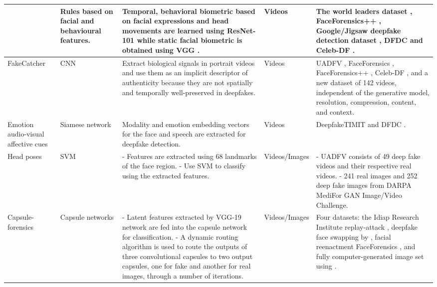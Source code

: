 \begin{table}[h!]
\begin{scriptsize}
\begin{tabularx}{\linewidth}{p{} p{} p{} p{} p{}}
& Rules based on facial and behavioural features.
& Temporal, behavioral biometric based on facial expressions and head movements are learned using ResNet-101  while static facial biometric is obtained using VGG .
& Videos
& The world leaders dataset , FaceForensics++ , Google/Jigsaw deepfake detection dataset , DFDC  and Celeb-DF .\\
\hline
FakeCatcher 
& CNN
& Extract biological signals in portrait videos and use them as an implicit descriptor of authenticity because they are not spatially and temporally well-preserved in deepfakes.
& Videos
& UADFV , FaceForensics , FaceForensics++ , Celeb-DF , and a new dataset of 142 videos, independent of the generative model, resolution, compression, content, and context.\\
\hline
Emotion audio-visual affective cues 
& Siamese network 
& Modality and emotion embedding vectors for the face and speech are extracted for deepfake detection.
& Videos
& DeepfakeTIMIT  and DFDC .\\
\hline
Head poses 
&SVM
&- Features are extracted using 68 landmarks of the face region.\newline
- Use SVM to classify using the extracted features.	
&Videos/\newline Images
&- UADFV consists of 49 deep fake videos and their respective real videos.\newline
- 241 real images and 252 deep fake images from DARPA MediFor GAN Image/Video Challenge.\\
\hline
Capsule-forensics 
&Capsule networks
&- Latent features extracted by VGG-19 network  are fed into the capsule network for classification.\newline
- A dynamic routing algorithm  is used to route the outputs of three convolutional capsules to two output capsules, one for fake and another for real images, through a number of iterations.	
&Videos/\newline Images
&Four datasets: the Idiap Research Institute replay-attack , deepfake face swapping by , facial reenactment FaceForensics , and fully computer-generated image set using .\\
\hline
\end{tabularx}
\end{scriptsize}
\end{table}
